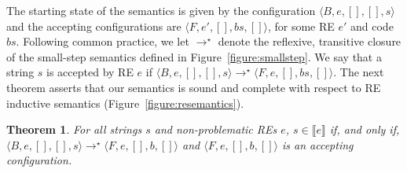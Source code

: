 \documentclass[oneside,12pt]{scrbook}
\newtheorem{Theorem}{Theorem}
\theoremstyle{definition}
\newcommand{\sembrackets}[1]{\ensuremath{\llbracket #1 \rrbracket}}
\newcommand{\conf}[1]{\ensuremath{\langle #1 \rangle}}
\theoremstyle{plain}
\theoremstyle{definition}
\begin{document}
The starting state of the semantics is given by the configuration
$\conf{B,e,[],[],s}$ and the accepting configurations are $\conf{F,e',[],bs,[]}$, for some RE $e'$ and code $bs$.
Following common practice, we let $\to^\star$ denote the reflexive, transitive closure of the small-step
semantics defined in Figure~\ref{figure:smallstep}.
We say that a string $s$ is accepted by RE $e$ if $\conf{B,e,[],[],s}\to^\star\conf{F,e,[],bs,[]}$.
The next theorem asserts that our semantics is sound and complete with respect to RE
inductive semantics (Figure~\ref{figure:resemantics}).

\begin{Theorem}
	For all strings $s$ and non-problematic REs $e$, $s\in\sembrackets{e}$ if, and only if, $\conf{B,e,[],[],s}\to^\star\conf{F,e,[],b,[]}$ and
	$\conf{F,e,[],b,[]}$ is an accepting configuration.
\end{Theorem}
\end{document}
